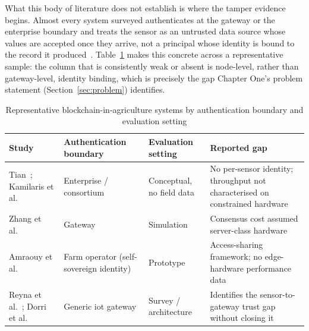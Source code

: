 What this body of literature does not establish is where the tamper
evidence begins. Almost every system surveyed authenticates at the gateway
or the enterprise boundary and treats the sensor as an untrusted data
source whose values are accepted once they arrive, not a principal whose
identity is bound to the record it produced~\cite{lin2020blockchain, ferrag2020blockchain, kamilaris2019rise, ali2023farmDataTampering}. Table~\ref{tab:lit-blockchain-ag} makes this
concrete across a representative sample: the column that is consistently
weak or absent is node-level, rather than gateway-level, identity binding,
which is precisely the gap Chapter One's problem statement
(Section~\ref{sec:problem}) identifies.

\begin{table}[htbp]
\centering
\caption{Representative blockchain-in-agriculture systems by authentication
         boundary and evaluation setting}
\label{tab:lit-blockchain-ag}
\footnotesize
\begin{tabularx}{\textwidth}{@{}p{}p{}p{}X@{}}
\toprule
\textbf{Study} & \textbf{Authentication boundary} & \textbf{Evaluation setting} & \textbf{Reported gap} \\
\midrule
Tian~\cite{tian2016agri}; Kamilaris et al.~\cite{kamilaris2019rise}
  & Enterprise / consortium & Conceptual, no field data
  & No per-sensor identity; throughput not characterised on constrained hardware \\
\midrule
Zhang et al.~\cite{zhang2019blockchain}
  & Gateway & Simulation
  & Consensus cost assumed server-class hardware \\
\midrule
Amraouy et al.~\cite{amraouy2025ssi}
  & Farm operator (self-sovereign identity)
  & Prototype
  & Access-sharing framework; no edge-hardware performance data \\
\midrule
Reyna et al.~\cite{reyna2018blockchain}; Dorri et al.~\cite{dorri2017blockchain}
  & Generic \gls{iot} gateway & Survey / architecture
  & Identifies the sensor-to-gateway trust gap without closing it \\
\bottomrule
\end{tabularx}
\end{table}

\label{subsec:lit_consensus}


